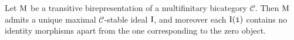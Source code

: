 




\noindent\begin{proposition}\label{UniqueMaximalIdeal} Let $\textnormal{M}$ be a transitive birepresentation of a multifinitary bicategory $\mathscr{C}$. Then $\textnormal{M}$ admits a unique maximal $\mathscr{C}$-stable ideal $\textnormal{I}$, and moreover each $\textnormal{I}(\textnormal{\texttt{i}})$ contains no identity morphisms apart from the one corresponding to the zero object.\\
\end{proposition}

